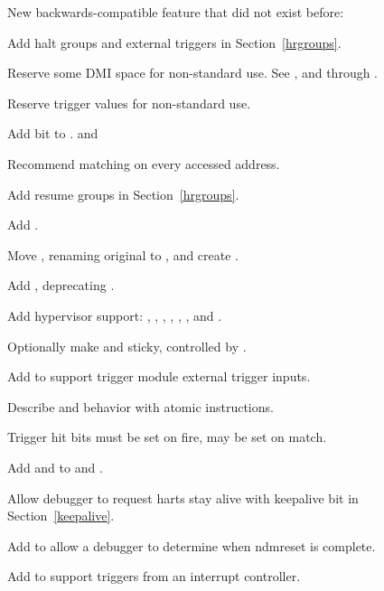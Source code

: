 \begin{steps}{New backwards-compatible feature that did not exist before:}
    \item Add halt groups and external triggers in Section~\ref{hrgroups}. 
    \item Reserve some DMI space for non-standard use. See \RdmCustom, and
        \RdmCustomZero through \RdmCustomFifteen. 
    \item Reserve trigger \FcsrTdataOneType values for non-standard use. 
    \item Add \FcsrItriggerNmi bit to \RcsrItrigger.  and 
    \item Recommend matching on every accessed address. 
    \item Add resume groups in Section~\ref{hrgroups}. 
    \item Add \FdmAbstractcsRelaxedpriv. 
    \item Move \RcsrScontext, renaming original to \RcsrMscontext, and create
        \RcsrHcontext. 
    \item Add \RcsrMcontrolSix, deprecating \RcsrMcontrol. 
    \item Add hypervisor support: \FcsrDcsrEbreakvs, \FcsrDcsrEbreakvu,
        \FcsrDcsrV, \RcsrHcontext, \RcsrMcontrol, \RcsrMcontrolSix, and
        \RvirtPriv. 
    \item Optionally make \FdmDmstatusAnyunavail and \FdmDmstatusAllunavail
    sticky, controlled by \FdmDmstatusStickyunavail. 
    \item Add \RcsrTmexttrigger to support trigger module external trigger
        inputs. 
    \item Describe \RcsrMcontrol and \RcsrMcontrolSix behavior with atomic instructions. 
    \item Trigger hit bits must be set on fire, may be set on match. 
    \item Add \FcsrTextraThirtytwoSbytemask and \FcsrTextraSixtyfourSbytemask
        to \RcsrTextraThirtytwo and \RcsrTextraSixtyfour. 
    \item Allow debugger to request harts stay alive with keepalive bit in
        Section~\ref{keepalive}. 
    \item Add \FdmDmstatusNdmresetpending to allow a debugger to determine
        when ndmreset is complete. 
    \item Add \FcsrTmexttriggerIntctl to support triggers from an interrupt controller. 
\end{steps}

